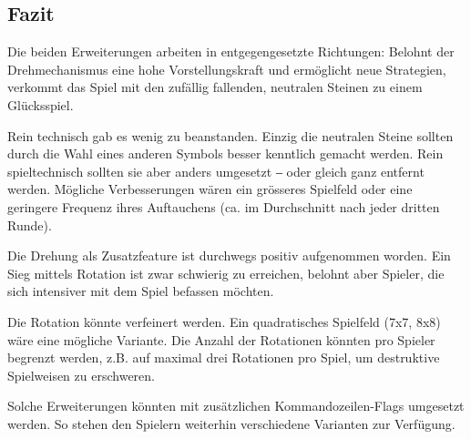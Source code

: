 \documentclass[a4paper,11pt,hidelinks]{scrartcl}
\begin{document}
\subsection{Fazit}

Die beiden Erweiterungen arbeiten in entgegengesetzte Richtungen: Belohnt der Drehmechanismus eine hohe Vorstellungskraft und ermöglicht neue Strategien, verkommt das Spiel mit den zufällig fallenden, neutralen Steinen zu einem Glücksspiel.

Rein technisch gab es wenig zu beanstanden. Einzig die neutralen Steine sollten durch die Wahl eines anderen Symbols besser kenntlich gemacht werden. Rein spieltechnisch sollten sie aber anders umgesetzt ‒ oder gleich ganz entfernt werden. Mögliche Verbesserungen wären ein grösseres Spielfeld oder eine geringere Frequenz ihres Auftauchens (ca. im Durchschnitt nach jeder dritten Runde).

Die Drehung als Zusatzfeature ist durchwegs positiv aufgenommen worden. Ein Sieg mittels Rotation ist zwar schwierig zu erreichen, belohnt aber Spieler, die sich intensiver mit dem Spiel befassen möchten.

Die Rotation könnte verfeinert werden. Ein quadratisches Spielfeld (7x7, 8x8) wäre eine mögliche Variante. Die Anzahl der Rotationen könnten pro Spieler begrenzt werden, z.B. auf maximal drei Rotationen pro Spiel, um destruktive Spielweisen zu erschweren.

Solche Erweiterungen könnten mit zusätzlichen Kommandozeilen-Flags umgesetzt werden. So stehen den Spielern weiterhin verschiedene Varianten zur Verfügung.

\newpage

\listoffigures
{}
\end{document}

